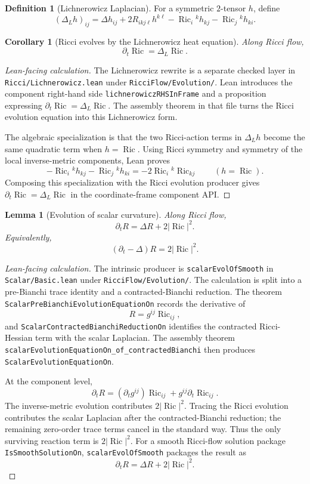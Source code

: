 \documentclass[11pt]{article}
\theoremstyle{plain}
\newtheorem{lemma}[theorem]{Lemma}
\newtheorem{corollary}[theorem]{Corollary}
\theoremstyle{definition}
\newtheorem{definition}[theorem]{Definition}
\theoremstyle{remark}
\newcommand{\Ric}{\operatorname{Ric}}
\newcommand{\norm}[1]{\left|#1\right|}
\newcommand{\leanref}[1]{\nolinkurl{#1}}
\newcommand{\leanfile}[1]{\nolinkurl{#1}}
\newcommand{\rffile}[1]{\leanfile{#1}}
\newcommand{\rfdir}[1]{\leanfile{#1/}}
\begin{document}
\begin{definition}[Lichnerowicz Laplacian]
\label{def:lichnerowicz-laplacian}
For a symmetric $2$-tensor $h$, define
\[
(\Delta_Lh)_{ij}
=
\Delta h_{ij}
+2R_{ikj\ell}h^{k\ell}
-\Ric_i{}^kh_{kj}
-\Ric_j{}^kh_{ki}.
\]
\end{definition}

\begin{corollary}[Ricci evolves by the Lichnerowicz heat equation]
\label{cor:ricci-lichnerowicz}
Along Ricci flow,
\[
\partial_t\Ric=\Delta_L\Ric.
\]
\end{corollary}

\begin{proof}[Lean-facing calculation]
The Lichnerowicz rewrite is a separate checked layer in
\rffile{Ricci/Lichnerowicz.lean} under \rfdir{RicciFlow/Evolution}.  Lean
introduces the component right-hand side
\leanref{lichnerowiczRHSInFrame} and a proposition expressing
\(\partial_t\Ric=\Delta_L\Ric\).  The assembly theorem in that file turns the
Ricci evolution equation into this Lichnerowicz form.

The algebraic specialization is that the two Ricci-action terms in
\(\Delta_Lh\) become the same quadratic term when \(h=\Ric\).  Using Ricci
symmetry and symmetry of the local inverse-metric components, Lean proves
\[
-\Ric_i{}^kh_{kj}-\Ric_j{}^kh_{ki}
=
-2\Ric_i{}^k\Ric_{kj}
\qquad (h=\Ric).
\]
Composing this specialization with the Ricci evolution producer gives
\(\partial_t\Ric=\Delta_L\Ric\) in the coordinate-frame component API.
\end{proof}

\begin{lemma}[Evolution of scalar curvature]
\label{lem:evol-scalar}
Along Ricci flow,
\[
\partial_tR=\Delta R+2\norm{\Ric}^2.
\]
Equivalently,
\[
(\partial_t-\Delta)R=2\norm{\Ric}^2.
\]
\end{lemma}

\begin{proof}[Lean-facing calculation]
The intrinsic producer is \leanref{scalarEvolOfSmooth} in
\rffile{Scalar/Basic.lean} under \rfdir{RicciFlow/Evolution}.  The calculation
is split into a pre-Bianchi trace identity and a contracted-Bianchi reduction.
The theorem \leanref{ScalarPreBianchiEvolutionEquationOn} records the
derivative of
\[
  R=g^{ij}\Ric_{ij},
\]
and \leanref{ScalarContractedBianchiReductionOn} identifies the contracted
Ricci-Hessian term with the scalar Laplacian.  The assembly theorem
\leanref{scalarEvolutionEquationOn_of_contractedBianchi} then produces
\leanref{ScalarEvolutionEquationOn}.

At the component level,
\[
\partial_tR=(\partial_tg^{ij})\Ric_{ij}+g^{ij}\partial_t\Ric_{ij}.
\]
The inverse-metric evolution contributes \(2\norm{\Ric}^2\).  Tracing the Ricci
evolution contributes the scalar Laplacian after the contracted-Bianchi
reduction; the remaining zero-order trace terms cancel in the standard way.
Thus the only surviving reaction term is \(2\norm{\Ric}^2\).  For a smooth
Ricci-flow solution package \leanref{IsSmoothSolutionOn},
\leanref{scalarEvolOfSmooth} packages the result as
\[
  \partial_tR=\Delta R+2\norm{\Ric}^2.
\]
\end{proof}
\end{document}
